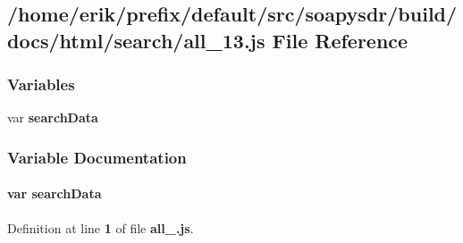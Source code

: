 \subsection{/home/erik/prefix/default/src/soapysdr/build/docs/html/search/all\+\_\+13.js File Reference}
\label{all__13_8js}
\subsubsection*{Variables}
\begin{DoxyCompactItemize}
\item 
var {\bf search\+Data}
\end{DoxyCompactItemize}


\subsubsection{Variable Documentation}
\paragraph[{search\+Data}]{\setlength{\rightskip}{0pt plus 5cm}var search\+Data}\label{all__13_8js_ad01a7523f103d6242ef9b0451861231e}


Definition at line {\bf 1} of file {\bf all\+\_.\+js}.

